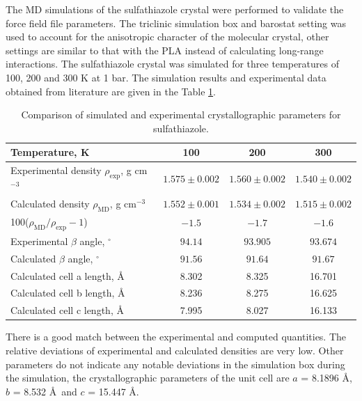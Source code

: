 The MD simulations of the sulfathiazole crystal were performed to validate the force field file parameters. The triclinic simulation box and barostat setting was used to account for the anisotropic character of the molecular crystal, other settings are similar to that with the PLA instead of calculating long-range interactions. The sulfathiazole crystal was simulated for three temperatures of 100, 200 and 300 K at 1 bar. The simulation results and experimental data obtained from literature \cite{drebushchak_crystal_2008} are given in the Table \ref{tab:sulfathiazol}.
 
    \begin{table}[htb]       
	\centering
	\begin{tabular}{lccc}
		\toprule
		Temperature, K & 100 & 200 & 300\\
		\midrule
		Experimental density $\rho_\mathrm{exp}$, g cm$^{-3}$  & $1.575 \pm 0.002$ & $1.560 \pm 0.002$ & $1.540 \pm 0.002$\\
		Calculated density $\rho_\mathrm{MD}$, g cm$^{-3}$ & $1.552 \pm 0.001$ & $1.534 \pm 0.002$ & $1.515 \pm 0.002$\\
		100($\rho_\mathrm{MD}/\rho_\mathrm{exp}-1$) & $-1.5$ & $-1.7$ & $-1.6$\\
		\midrule
		Experimental $\beta$ angle, $^{\circ}$ & $94.14$ & $93.905$ & $93.674$\\
		
		Calculated $\beta$ angle, $^{\circ}$ & $91.56$ & $91.64$ & $91.67$\\
		
		Calculated cell a length, \AA & 8.302 & 8.325 & 16.701\\
		
		Calculated cell b length, \AA & 8.236 & 8.275 & 16.625\\
		
		Calculated cell c length, \AA & 7.995 & 8.027 & 16.133\\
		\bottomrule
	\end{tabular}
	\caption{Comparison of simulated and experimental crystallographic parameters for sulfathiazole.}
	\label{tab:sulfathiazol}
\end{table}

There is a good match between the experimental and computed quantities. The relative deviations of experimental and calculated densities are very low. Other parameters do not indicate any notable deviations in the simulation box during the simulation, the crystallographic parameters of the unit cell are $a$ = 8.1896 \AA, $b$ = 8.532 \AA~and  $c$ = 15.447 \AA. 

